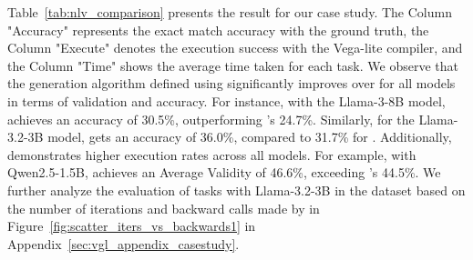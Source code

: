 {%
Table~\ref{tab:nlv_comparison} presents the result for our case study.
The Column "Accuracy" represents the exact match accuracy with the ground truth, the Column "Execute" denotes the execution success with the Vega-lite compiler, and the Column "Time" shows the average time taken for each task.
We observe that the generation algorithm defined using \Tool{} significantly improves over \syncode{} for all models in terms of validation and accuracy.
For instance, with the Llama-3-8B model, \Tool{} achieves an accuracy of 30.5\%, outperforming \syncode{}'s 24.7\%.
Similarly, for the Llama-3.2-3B model, \Tool{} gets an accuracy of 36.0\%, compared to 31.7\% for \syncode{}.
Additionally, \Tool{} demonstrates higher execution rates across all models.
For example, with Qwen2.5-1.5B, \Tool{} achieves an Average Validity of 46.6\%, exceeding \syncode{}'s 44.5\%. We further analyze the evaluation of tasks with Llama-3.2-3B  in the dataset based on the number of iterations and backward calls made by \Tool{} in Figure~\ref{fig:scatter_iters_vs_backwards1} in Appendix~\ref{sec:vgl_appendix_casestudy}.
} 

